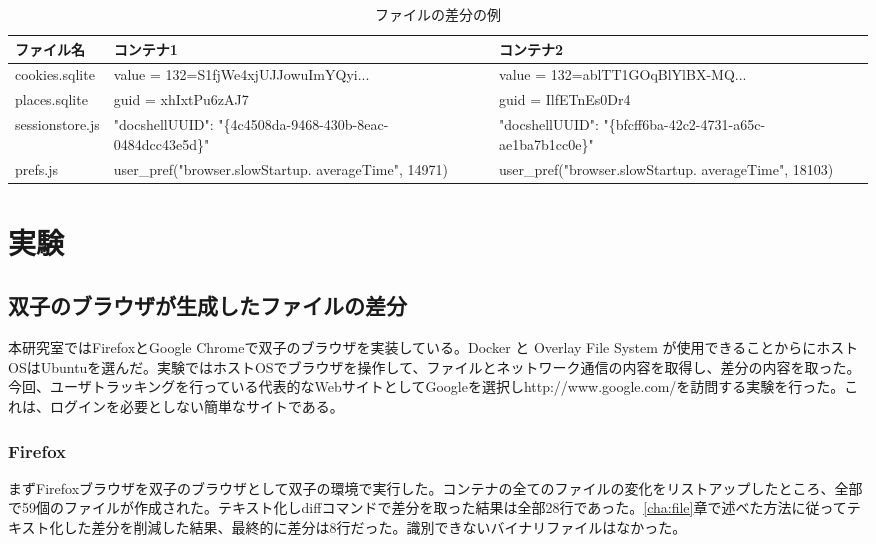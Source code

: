\documentclass[a4paper,twocolumn,10pt]{jarticle}
\begin{document}
\begin{table*}[ht]



\caption{ファイルの差分の例}
\centering

\begin{tabular}{ |l|p{4cm}|p{4cm}| }

 \hline
 \footnotesize{ファイル名}　&\footnotesize{コンテナ1}　&\footnotesize{コンテナ2}\\
 \hline
 \footnotesize{cookies.sqlite} & \footnotesize{value = 132=S1fjWe4xjUJJowuImYQyi...} & \footnotesize{value = 132=ablTT1GOqBlYlBX-MQ...}\\
\hline
 \footnotesize{places.sqlite} & \footnotesize{guid = xhIxtPu6zAJ7} & \footnotesize{guid = IlfETnEs0Dr4}\\
\hline
 \footnotesize{sessionstore.js} & \footnotesize{"docshellUUID": "\{4c4508da-9468-430b-8eac- 0484dcc43e5d\}"} & \footnotesize{"docshellUUID": "\{bfcff6ba-42c2-4731-a65c- ae1ba7b1cc0e\}"}\\
 \hline
\footnotesize{prefs.js} & \footnotesize{user\_pref("browser.slowStartup. averageTime", 14971)} & \footnotesize{user\_pref("browser.slowStartup. averageTime", 18103)}\\
\hline
\end{tabular}
\label{fig:data}
\end{table*}







\section{実験}
\subsection{双子のブラウザが生成したファイルの差分}
\label{sec:file}

本研究室ではFirefoxとGoogle Chromeで双子のブラウザを実装している。Docker と Overlay File System が使用できることからにホストOSはUbuntuを選んだ。実験ではホストOSでブラウザを操作して、ファイルとネットワーク通信の内容を取得し、差分の内容を取った。今回、ユーザトラッキングを行っている代表的なWebサイトとしてGoogleを選択しhttp://www.google.com/を訪問する実験を行った。これは、ログインを必要としない簡単なサイトである。

\subsubsection{Firefox}
まずFirefoxブラウザを双子のブラウザとして双子の環境で実行した。コンテナの全てのファイルの変化をリストアップしたところ、全部で59個のファイルが作成された。テキスト化しdiffコマンドで差分を取った結果は全部28行であった。\ref{cha:file}章で述べた方法に従ってテキスト化した差分を削減した結果、最終的に差分は8行だった。識別できないバイナリファイルはなかった。
\end{document}
